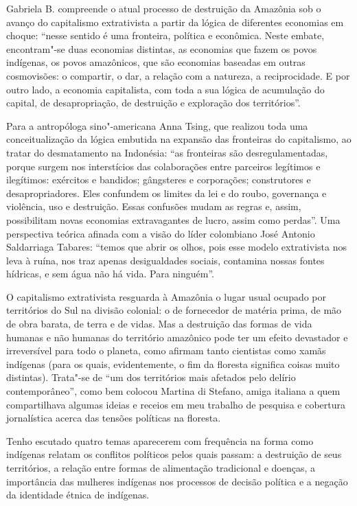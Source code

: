 Gabriela B. compreende o atual processo de destruição da Amazônia sob o
avanço do capitalismo extrativista a partir da lógica de diferentes
economias em choque: ``nesse sentido é uma fronteira, política e
econômica. Neste embate, encontram"-se duas economias distintas, as
economias que fazem os povos indígenas, os povos amazônicos, que são
economias baseadas em outras cosmovisões: o compartir, o dar, a relação
com a natureza, a reciprocidade. E por outro lado, a economia
capitalista, com toda a sua lógica de acumulação do capital, de
desapropriação, de destruição e exploração dos territórios''.

Para a antropóloga sino"-americana Anna Tsing, que realizou toda uma
conceitualização da lógica embutida na expansão das fronteiras do
capitalismo, ao tratar do desmatamento na Indonésia: ``as fronteiras são desregulamentadas, porque surgem nos interstícios das colaborações entre parceiros legítimos e ilegítimos: exércitos e bandidos; gângsteres e corporações; construtores e desapropriadores. Eles confundem os limites da lei e do roubo, governança e  violência, uso e destruição. Essas confusões mudam as regras e, assim, possibilitam novas economias extravagantes de lucro, assim como perdas''. %
Uma perspectiva
teórica afinada com a visão do líder colombiano José Antonio Saldarriaga
Tabares: ``temos que abrir os olhos, pois esse modelo extrativista nos
leva à ruína, nos traz apenas desigualdades sociais, contamina nossas
fontes hídricas, e sem água não há vida. Para ninguém''.

O capitalismo extrativista resguarda à Amazônia o lugar usual ocupado
por territórios do Sul na divisão colonial: o de fornecedor de matéria
prima, de mão de obra barata, de terra e de vidas. Mas a destruição das
formas de vida humanas e não humanas do território amazônico pode ter um
efeito devastador e irreversível para todo o planeta, como afirmam tanto
cientistas como xamãs indígenas (para os quais, evidentemente, o fim
da floresta significa coisas muito distintas). Trata"-se de ``um dos
territórios mais afetados pelo delírio contemporâneo'', como bem colocou
Martina di Stefano, amiga italiana a quem compartilhava algumas ideias e
receios em meu trabalho de pesquisa e cobertura jornalística acerca das tensões
políticas na floresta.

\asterisc

Tenho escutado quatro temas aparecerem com frequência na forma como indígenas relatam os
conflitos políticos pelos quais passam: a destruição de seus territórios, a relação entre formas de alimentação tradicional e doenças, a importância das mulheres indígenas
nos processos de decisão política e a negação da identidade étnica de
indígenas.

